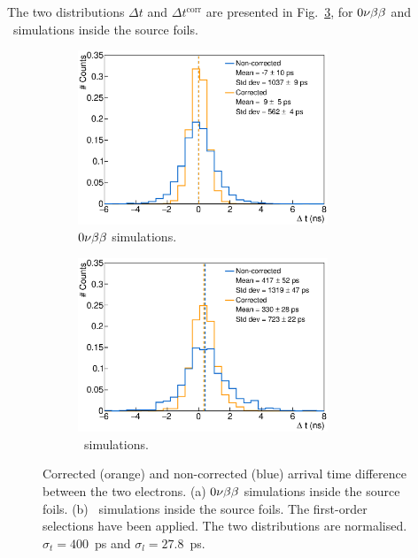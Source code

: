 The two distributions $\Delta t$ and $\Delta t^{\text{corr}}$ are presented in Fig.~\ref{fig:delta_t}, for $0\nu\beta\beta$ and \Tl\ simulations inside the source foils.
\begin{figure}[!h]
\centering
\begin{subfigure}[t]{1.\textwidth}
  \centering
  \includegraphics[width=0.82\textwidth]{timedifference/fig_timediff/0nubb_delta_t.eps}
  \captionsetup{justification=justified}
  \caption{$0\nu\beta\beta$ simulations.
    \label{subfig:0nubb_delta_t}}
\end{subfigure}
\hfill
\begin{subfigure}[t]{1.\textwidth}
  \centering
  \includegraphics[width=0.82\textwidth]{timedifference/fig_timediff/208Tl_delta_t.eps}
  \captionsetup{justification=justified}
  \caption{\Tl\ simulations.
    \label{subfig:208Tl_delta_t}}
\end{subfigure}
\caption{Corrected (orange) and non-corrected (blue) arrival time difference between the two electrons.
  (a) $0\nu\beta\beta$ simulations inside the source foils.
  (b) \Tl\ simulations inside the source foils.
  The first-order selections have been applied.
  The two distributions are normalised.
  $\sigma_{t}=400$~ps and $\sigma_{l}=27.8$~ps.
  \label{fig:delta_t}}
\end{figure}
